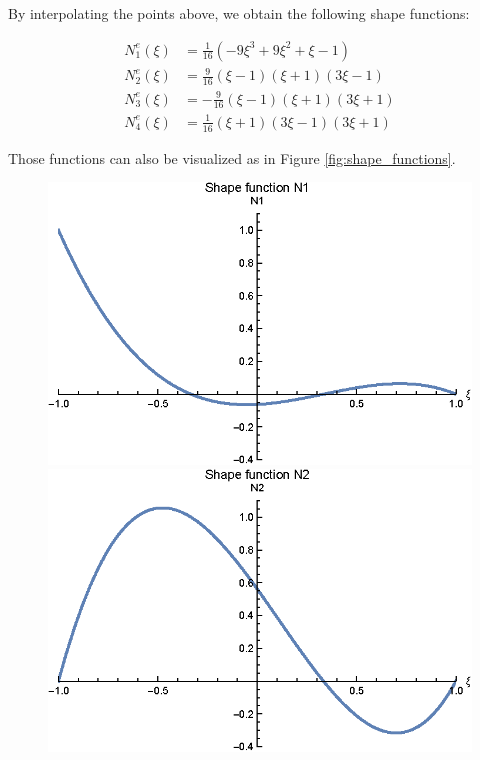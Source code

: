 By interpolating the points above, we obtain the following shape functions:

\begin{align}
    N_1^e(\xi) & = \frac{1}{16} (-9 \xi ^3+9 \xi ^2+\xi -1)    \\
    N_2^e(\xi) & = \frac{9}{16} (\xi -1) (\xi +1) (3 \xi -1)   \\
    N_3^e(\xi) & = -\frac{9}{16}(\xi -1) (\xi +1) (3 \xi +1)   \\
    N_4^e(\xi) & = \frac{1}{16} (\xi +1) (3 \xi -1) (3 \xi +1)
\end{align}

Those functions can also be visualized as in Figure \ref{fig:shape_functions}.

\begin{figure}[H]
    \begin{minipage}[b]{0.45\textwidth}
        \centering
        \includegraphics[width=\textwidth]{pdf/shape_function_N1}
    \end{minipage}
    \hfill
    \begin{minipage}[b]{0.45\textwidth}
        \centering
        \includegraphics[width=\textwidth]{pdf/shape_function_N2}

\end{minipage}
\end{figure}

